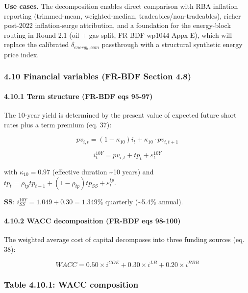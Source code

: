\documentclass[
]{article}
\begin{document}
\textbf{Use cases.} The decomposition enables direct comparison with RBA
inflation reporting (trimmed-mean, weighted-median,
tradeables/non-tradeables), richer post-2022 inflation-surge
attribution, and a foundation for the energy-block routing in Round 2.1
(oil + gas split, FR-BDF wp1044 Appx E), which will replace the
calibrated \(\delta_{energy,com}\) passthrough with a structural
synthetic energy price index.

\subsubsection{4.10 Financial variables (FR-BDF Section
4.8)}\label{financial-variables-fr-bdf-section-4.8}

\paragraph{4.10.1 Term structure (FR-BDF eqs
95-97)}\label{term-structure-fr-bdf-eqs-95-97}

The 10-year yield is determined by the present value of expected future
short rates plus a term premium (eq. 37):

\[pv_{i,t} = (1 - \kappa_{10}) i_t + \kappa_{10} \cdot pv_{i,t+1}\]

\[i^{10Y}_t = pv_{i,t} + tp_t + \varepsilon^{10Y}_t\]

with \(\kappa_{10} = 0.97\) (effective duration \textasciitilde10 years)
and
\(tp_t = \rho_{tp} tp_{t-1} + (1-\rho_{tp}) tp_{SS} + \varepsilon^{tp}_t\).

\textbf{SS}: \(i^{10Y}_{SS} = 1.049 + 0.30 = 1.349\%\) quarterly
(\textasciitilde5.4\% annual).

\paragraph{4.10.2 WACC decomposition (FR-BDF eqs
98-100)}\label{wacc-decomposition-fr-bdf-eqs-98-100}

The weighted average cost of capital decomposes into three funding
sources (eq. 38):

\[WACC = 0.50 \times i^{COE} + 0.30 \times i^{LB} + 0.20 \times i^{BBB}\]

\subsubsection{Table 4.10.1: WACC
composition}\label{table-4.10.1-wacc-composition}
\end{document}
